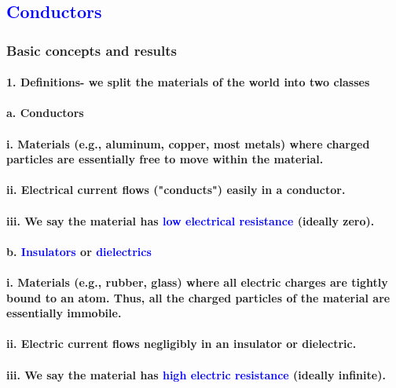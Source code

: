 \documentclass{article}
\begin{document}
\subsection{\textcolor{blue}{ Conductors}}
\subsubsection{Basic concepts and results}
\paragraph{1. Definitions- we split the materials of the world into two classes}
\paragraph{\indent a. Conductors}
\paragraph{\indent\indent i. Materials (e.g., aluminum, copper, most metals) where charged particles are essentially free to move within the material.}
\paragraph{\indent\indent ii. Electrical current flows ("conducts") easily in a conductor. }
\paragraph{\indent\indent iii. We say the material has \textcolor{blue}{low electrical resistance} (ideally zero).}
\paragraph{\indent b. \textcolor{blue}{Insulators} or \textcolor{blue}{dielectrics}}
\paragraph{\indent\indent i. Materials (e.g., rubber, glass) where all electric charges are tightly bound to an atom. Thus, all the charged particles of the material are essentially immobile.}
\paragraph{\indent\indent ii. Electric current flows negligibly in an insulator or dielectric.}
\paragraph{\indent\indent iii. We say the material has \textcolor{blue}{high electric resistance} (ideally infinite).}
\end{document}
